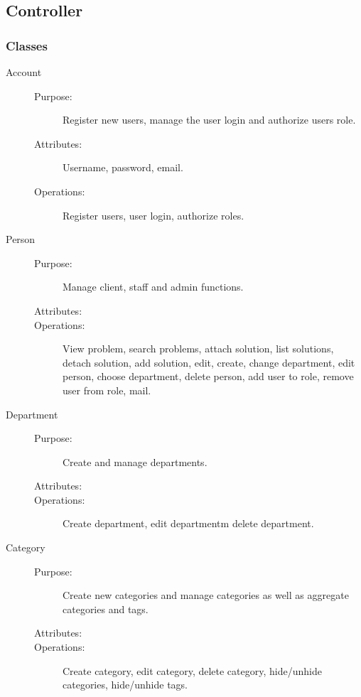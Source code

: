 \subsection{Controller}

\subsubsection{Classes}

\begin{description}
\item[Account]\hfill
\begin{description}
\item[Purpose:]Register new users, manage the user login and authorize users role.
\item[Attributes:] Username, password, email.
\item[Operations:]Register users, user login, authorize roles.
\end{description}
\end{description}

\begin{description}
\item[Person]\hfill
\begin{description}
\item[Purpose:]Manage client, staff and admin functions.
\item[Attributes:]
\item[Operations:]View problem, search problems, attach solution, list solutions, detach solution, add solution, edit, create, change department, edit person, choose department, delete person, add user to role, remove user from role, mail.
\end{description}
\end{description}

\begin{description}
\item[Department]\hfill
\begin{description}
\item[Purpose:]Create and manage departments.
\item[Attributes:]
\item[Operations:]Create department, edit departmentm delete department.
\end{description}
\end{description}

\begin{description}
\item[Category]\hfill
\begin{description}
\item[Purpose:]Create new categories and manage categories as well as aggregate categories and tags.
\item[Attributes:]
\item[Operations:]Create category, edit category, delete category, hide/unhide categories, hide/unhide tags.
\end{description}
\end{description}

